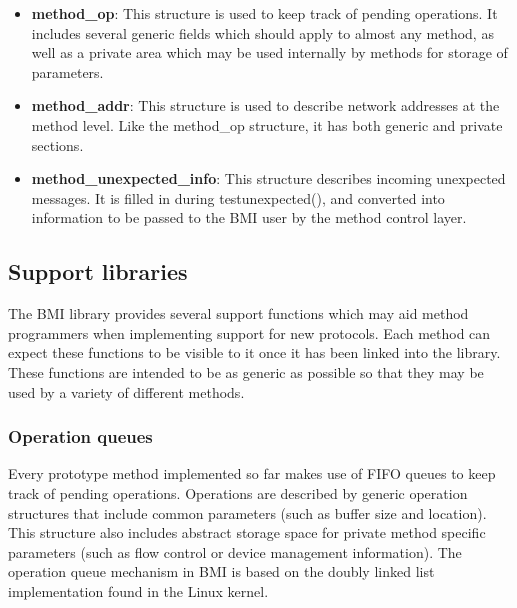\documentclass[11pt]{article}
\begin{document}
\begin{itemize}
\item \textbf{method\_op}:  This structure is used to keep track
of pending operations.  It includes several generic fields which
should apply to almost any method, as well as a private area which
may be used internally by methods for storage of parameters.
\item \textbf{method\_addr}:  This structure is used to describe
network addresses at the method level.  Like the method\_op
structure, it has both generic and private sections.
\item \textbf{method\_unexpected\_info}: This structure describes
incoming unexpected messages.  It is filled in during
testunexpected(), and converted into information to be passed to
the BMI user by the method control layer.
\end{itemize}

\subsection{Support libraries}
\label{sec:support}

The BMI library provides several support functions which may aid
method programmers when implementing support for new protocols.  Each
method can expect these functions to be visible to it once it has been
linked into the library.
These functions are
intended to be as generic as possible so that they may be used by a
variety of different methods.

\subsubsection{Operation queues}

Every prototype method implemented so far makes use of FIFO queues to
keep track of pending operations.  Operations are described by generic
operation structures that include common parameters (such as buffer
size and location).  This structure also includes abstract storage space
for private method specific parameters (such as flow control or device
management information).  The operation queue mechanism in BMI is based
on the doubly linked list implementation found in the Linux kernel. 
\end{document}
